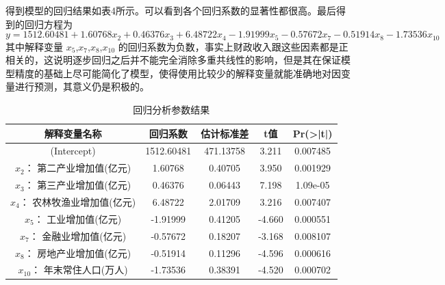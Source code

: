 \documentclass [a4paper]{article}
\begin{document}
得到模型的回归结果如表4所示。可以看到各个回归系数的显著性都很高。最后得到的回归方程为
$$y = 1512.60481 +1.60768x_2 +0.46376x_3+6.48722x_4 -1.91999x_5 -0.57672x_7 -0.51914x_8 - 1.73536x_{10}$$
其中解释变量 $x_5$,$x_7$,$x_8$,$x_{10}$ 的回归系数为负数，事实上财政收入跟这些因素都是正相关的，这说明逐步回归之后并不能完全消除多重共线性的影响，但是其在保证模型精度的基础上尽可能简化了模型，使得使用比较少的解释变量就能准确地对因变量进行预测，其意义仍是积极的。
\begin{table}
  \centering
  \caption{回归分析参数结果}
  \small %
  \begin{tabular}{ccccc}
    \toprule
      解释变量名称 & 回归系数 & 估计标准差 & t值 & Pr(>|t|)  \\
    \midrule
    (Intercept) &1512.60481  &471.13758 &  3.211 &0.007485 \\
    $x_2$： 第二产业增加值(亿元) &  1.60768   &   0.40705   &  3.950  & 0.001929 \\
$x_3$： 第三产业增加值(亿元)      &     0.46376  &      0.06443 &  7.198  &   1.09e-05 \\
$x_4$：  农林牧渔业增加值(亿元)      &         6.48722  &  2.01709   &3.216& 0.007407 \\
$x_5$：  工业增加值(亿元)   &         -1.91999   & 0.41205  &-4.660& 0.000551 \\
$x_7$：   金融业增加值(亿元)   &         -0.57672    &0.18207  &-3.168& 0.008107 \\
$x_8$：   房地产业增加值(亿元)  &      -0.51914 &   0.11296 & -4.596& 0.000616 \\
$x_{10}$：   年末常住人口(万人) &        -1.73536  &  0.38391 & -4.520& 0.000702 \\

    \bottomrule

  \end{tabular}


\end{table}
\end{document}
